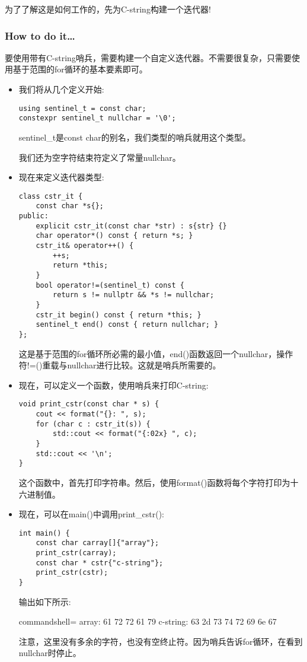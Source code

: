为了了解这是如何工作的，先为C-string构建一个迭代器!

\subsubsection{How to do it…}

要使用带有C-string哨兵，需要构建一个自定义迭代器。不需要很复杂，只需要使用基于范围的for循环的基本要素即可。

\begin{itemize}
\item 
我们将从几个定义开始:

\begin{lstlisting}[style=styleCXX]
using sentinel_t = const char;
constexpr sentinel_t nullchar = '\0';
\end{lstlisting}

sentinel\_t是const char的别名，我们类型的哨兵就用这个类型。

我们还为空字符结束符定义了常量nullchar。

\item 
现在来定义迭代器类型:

\begin{lstlisting}[style=styleCXX]
class cstr_it {
	const char *s{};
public:
	explicit cstr_it(const char *str) : s{str} {}
	char operator*() const { return *s; }
	cstr_it& operator++() {
		++s;
		return *this;
	}
	bool operator!=(sentinel_t) const {
		return s != nullptr && *s != nullchar;
	}
	cstr_it begin() const { return *this; }
	sentinel_t end() const { return nullchar; }
};
\end{lstlisting}

这是基于范围的for循环所必需的最小值，end()函数返回一个nullchar，操作符!=()重载与nullchar进行比较。这就是哨兵所需要的。

\item 
现在，可以定义一个函数，使用哨兵来打印C-string:

\begin{lstlisting}[style=styleCXX]
void print_cstr(const char * s) {
	cout << format("{}: ", s);
	for (char c : cstr_it(s)) {
		std::cout << format("{:02x} ", c);
	}
	std::cout << '\n';
}
\end{lstlisting}

这个函数中，首先打印字符串。然后，使用format()函数将每个字符打印为十六进制值。

\item 
现在，可以在main()中调用print\_cstr():

\begin{lstlisting}[style=styleCXX]
int main() {
	const char carray[]{"array"};
	print_cstr(carray);
	const char * cstr{"c-string"};
	print_cstr(cstr);
}
\end{lstlisting}

输出如下所示:

\begin{tcblisting}{commandshell={}}
array: 61 72 72 61 79
c-string: 63 2d 73 74 72 69 6e 67
\end{tcblisting}

注意，这里没有多余的字符，也没有空终止符。因为哨兵告诉for循环，在看到nullchar时停止。

\end{itemize}


